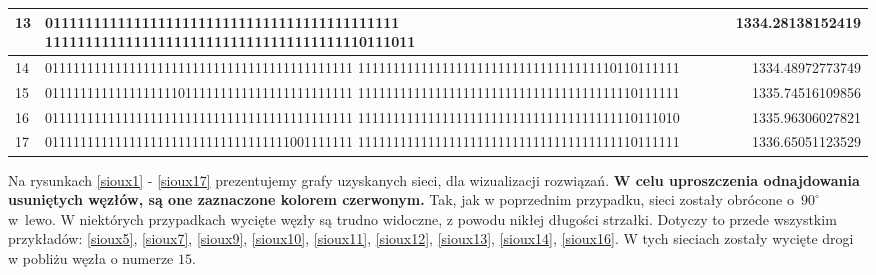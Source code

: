 \documentclass[twoside,12pt]{report}
\begin{document}
\begin{minipage}{\linewidth}
\begin{tabularx}{\linewidth}{ | l | X | r | }
	13 & 01111111111111111111111111111111111111111111 1111111111111111111111111111111111111110111011 & 1334.28138152419 \\ \hline
	14 & 01111111111111111111111111111111111111111111 1111111111111111111111111111111111110110111111 & 1334.48972773749 \\ \hline
	15 & 01111111111111111110111111111111111111111111 1111111111111111111111111111111111111110111111 & 1335.74516109856 \\ \hline
	16 & 01111111111111111111111111111111111111111111 1111111111111111111111111111111111111110111010 & 1335.96306027821 \\ \hline
	17 & 01111111111111111111111111111111111001111111 1111111111111111111111111111111111111110111111 & 1336.65051123529 \\ \hline
\end{tabularx}
\end{minipage}%

\newpage
Na rysunkach \ref{sioux1} - \ref{sioux17} prezentujemy grafy uzyskanych sieci, dla wizualizacji rozwiązań. \textbf{W celu uproszczenia odnajdowania usuniętych węzłów, są one zaznaczone kolorem czerwonym.} Tak, jak w poprzednim przypadku, sieci zostały obrócone o~$90^{\circ}$ w~lewo. W niektórych przypadkach wycięte węzły są trudno widoczne, z powodu nikłej długości strzałki. Dotyczy to przede wszystkim przykładów: \ref{sioux5}, \ref{sioux7}, \ref{sioux9}, \ref{sioux10}, \ref{sioux11}, \ref{sioux12}, \ref{sioux13}, \ref{sioux14}, \ref{sioux16}. W tych sieciach zostały wycięte drogi w pobliżu węzła o numerze $ 15$.
\end{document}
